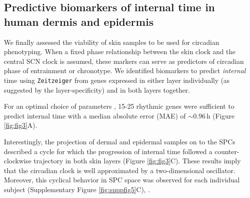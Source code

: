 
\subsection*{Predictive biomarkers of internal time in human dermis and epidermis}
We finally assessed the viability of skin samples to be used for circadian phenotyping. When a fixed phase relationship between the skin clock and the central SCN clock is assumed, these markers can serve as predictors of circadian phase of entrainment or chronotype. We identified biomarkers to predict \textit{internal} time using \texttt{Zeitzeiger} from genes expressed in either layer individually (as suggested by the layer-specificity) and in both layers together.

For an optimal choice of parameters , 15-25 rhythmic genes were sufficient to predict internal time with a median absolute error (MAE) of $\sim 0.96$\,h (Figure \ref{fig:fig3}A). 



Interestingly, the projection of dermal and epidermal samples on to the SPCs described a cycle for which the progression of internal time followed a counter-clockwise trajectory in both skin layers (Figure \ref{fig:fig3}C). These results imply that the circadian clock is well approximated by a two-dimensional oscillator. Moreover, this cyclical behavior in SPC space was observed for each individual subject (Supplementary Figure \ref{fig:suppfig5}C), . \\




